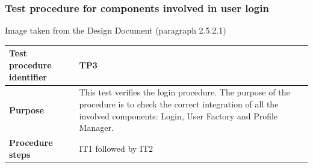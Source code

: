 \documentclass{article}
\begin{document}
			\subsubsection{Test procedure for components involved in user login} \label{sec:3.2.3}
				\begin{minipage}{\linewidth}
				\end{minipage}
				\begin{center}
					Image taken from the Design Document (paragraph 2.5.2.1)
				\end{center}
				\begin{center}
					\setlength{\tabcolsep}{24pt}
					\renewcommand{\arraystretch}{1.4}
					\begin{tabular}{ | l | p{8cm} |}\hline
						\textbf{Test procedure identifier} & TP3\\\hline
						\textbf{Purpose} & This test verifies the login procedure. The purpose of the procedure is to check the correct integration of all the involved components: Login, User Factory and Profile Manager. \\\hline
						\textbf{Procedure steps} & IT1 followed by IT2 \\\hline
					\end{tabular}
				\end{center}
\end{document}
